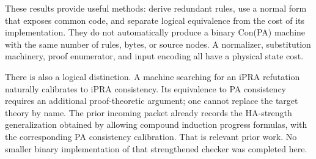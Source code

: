 \documentclass[11pt,a4paper]{article}
\begin{document}
These results provide useful methods: derive redundant rules, use a
normal form that exposes common code, and separate logical equivalence from
the cost of its implementation. They do not automatically produce a
binary Con(PA) machine with the same number of rules, bytes, or source
nodes. A normalizer, substitution machinery, proof enumerator, and input
encoding all have a physical state cost.

There is also a logical distinction. A machine searching for an iPRA
refutation naturally calibrates to iPRA consistency. Its equivalence to
PA consistency requires an additional proof-theoretic argument; one cannot
replace the target theory by name. The prior incoming packet
 already records the HA-strength
generalization obtained by allowing compound induction progress formulas,
with the corresponding PA consistency calibration. That is relevant prior
work. No smaller binary implementation of that strengthened checker was
completed here.
\end{document}
